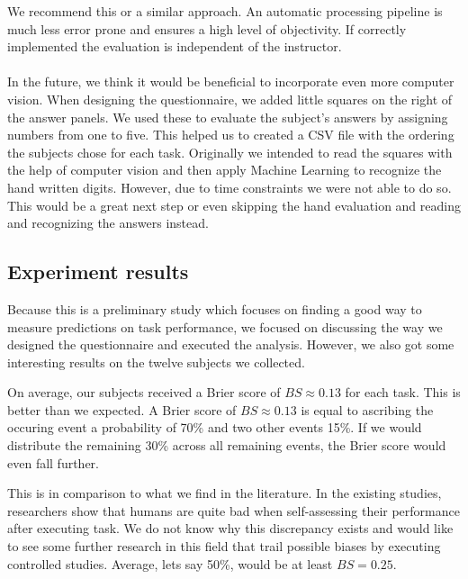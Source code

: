 \documentclass[../main/main.tex]{subfiles}
\begin{document}
	We recommend this or a similar approach. An automatic processing pipeline is much less error prone and ensures a high level of objectivity. If correctly implemented the evaluation is independent of the instructor. 
	\\\\
	In the future, we think it would be beneficial to incorporate even more computer vision. When designing the questionnaire, we added little squares on the right of the answer panels. We used these to evaluate the subject's answers by assigning numbers from one to five. This helped us to created a CSV file with the ordering the subjects chose for each task. Originally we intended to read the squares with the help of computer vision and then apply Machine Learning to recognize the hand written digits. However, due to time constraints we were not able to do so. This would be a great next step or even skipping the hand evaluation and reading and recognizing the answers instead.
	
	\subsection{Experiment results}
	\label{sec:exp_results}
	
	Because this is a preliminary study which focuses on finding a good way to measure predictions on task performance, we focused on discussing the way we designed the questionnaire and executed the analysis. However, we also got some interesting results on the twelve subjects we collected.
	
	On average, our subjects received a Brier score of $BS \approx 0.13$ for each task. This is better than we expected. A Brier score of $BS \approx 0.13$ is equal to ascribing the occuring event a probability of 70\% and two other events 15\%. If we would distribute the remaining 30\% across all remaining events, the Brier score would even fall further. 
	
	This is in comparison to what we find in the literature. In the existing studies, researchers show that humans are quite bad when self-assessing their performance after executing task. We do not know why this discrepancy exists and would like to see some further research in this field that trail possible biases by executing controlled studies. Average, lets say 50\%, would be at least $BS = 0.25$.
	
	
	
	
\end{document}
